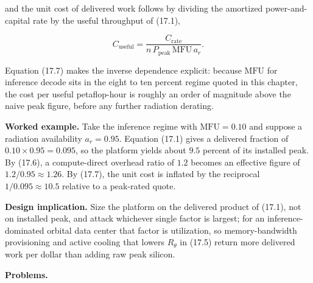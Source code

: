 \documentclass[
  11pt,
  openany,
  oneside]{book}
\begin{document}
and the unit cost of delivered work follows by dividing the amortized
power-and-capital rate by the useful throughput of (17.1),

\begin{equation}
C_{\mathrm{useful}} = \frac{C_{\mathrm{rate}}}{n\,P_{\mathrm{peak}}\,\mathrm{MFU}\,a_r}. \tag{17.7}
\end{equation}

Equation (17.7) makes the inverse dependence explicit: because
\(\mathrm{MFU}\) for inference decode sits in the eight to ten percent
regime quoted in this chapter, the cost per useful petaflop-hour is
roughly an order of magnitude above the naive peak figure, before any
further radiation derating.

\textbf{Worked example.} Take the inference regime with
\(\mathrm{MFU} = 0.10\) and suppose a radiation availability
\(a_r = 0.95\). Equation (17.1) gives a delivered fraction of
\(0.10 \times 0.95 = 0.095\), so the platform yields about \(9.5\)
percent of its installed peak. By (17.6), a compute-direct overhead
ratio of \(1.2\) becomes an effective figure of
\(1.2 / 0.95 \approx 1.26\). By (17.7), the unit cost is inflated by the
reciprocal \(1/0.095 \approx 10.5\) relative to a peak-rated quote.

\textbf{Design implication.} Size the platform on the delivered product
of (17.1), not on installed peak, and attack whichever single factor is
largest; for an inference-dominated orbital data center that factor is
utilization, so memory-bandwidth provisioning and active cooling that
lowers \(R_{\theta}\) in (17.5) return more delivered work per dollar
than adding raw peak silicon.

\textbf{Problems.}
\end{document}
